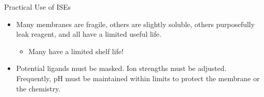 \documentclass[notes=show]{beamer}
\begin{document}
\begin{frame}[allowframebreaks]{Practical Use of ISEs}
	\framebreak
	
	\begin{itemize}
		\item Many membranes are fragile, others are slightly soluble,
			others purposefully leak reagent, and all have a limited
			useful life.
			\begin{itemize}
				\item Many have a limited shelf life!
			\end{itemize}
		\item Potential ligands must be masked.  Ion strengths must be
			adjusted.  Frequently, pH must be maintained within
			limits to protect the membrane or the chemistry.
	\end{itemize}

	\framebreak

	
\end{frame}

%
\end{document}
